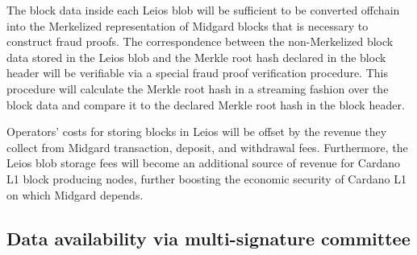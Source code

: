 \documentclass[../midgard.tex]{subfiles}
\begin{document}
The block data inside each Leios blob will be sufficient to be converted offchain into the Merkelized representation of Midgard blocks that is necessary to construct fraud proofs.
The correspondence between the non-Merkelized block data stored in the Leios blob and the Merkle root hash declared in the block header will be verifiable via a special fraud proof verification procedure.
This procedure will calculate the Merkle root hash in a streaming fashion over the block data and compare it to the declared Merkle root hash in the block header.


Operators' costs for storing blocks in Leios will be offset by the revenue they collect from Midgard transaction, deposit, and withdrawal fees.
Furthermore, the Leios blob storage fees will become an additional source of revenue for Cardano L1 block producing nodes, further boosting the economic security of Cardano L1 on which Midgard depends.

\subsection{Data availability via multi-signature committee}
\label{h:data-availability-multisig}
\end{document}
